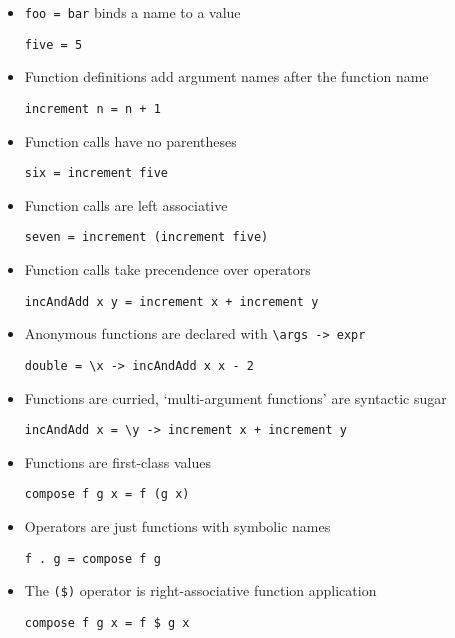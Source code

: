 \begin{itemize}
\item \verb|foo = bar| binds a name to a value
\begin{verbatim}
five = 5
\end{verbatim}

\item Function definitions add argument names after the function name
\begin{verbatim}
increment n = n + 1
\end{verbatim}

\item Function calls have no parentheses
\begin{verbatim}
six = increment five
\end{verbatim}

\item Function calls are left associative
\begin{verbatim}
seven = increment (increment five)
\end{verbatim}

\item Function calls take precendence over operators
\begin{verbatim}
incAndAdd x y = increment x + increment y
\end{verbatim}

\item Anonymous functions are declared with \verb|\args -> expr|
\begin{verbatim}
double = \x -> incAndAdd x x - 2
\end{verbatim}

\item Functions are curried, `multi-argument functions' are syntactic
  sugar
\begin{verbatim}
incAndAdd x = \y -> increment x + increment y
\end{verbatim}

\item Functions are first-class values
\begin{verbatim}
compose f g x = f (g x)
\end{verbatim}

\item Operators are just functions with symbolic names
\begin{verbatim}
f . g = compose f g
\end{verbatim}

\pagebreak
\item The \verb|($)| operator is right-associative function application
\begin{verbatim}
compose f g x = f $ g x
\end{verbatim}


\end{itemize}
